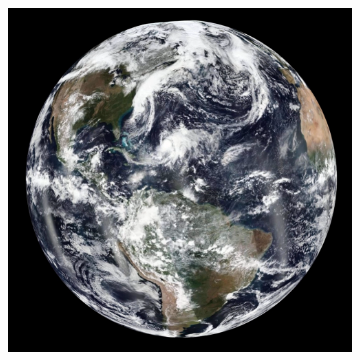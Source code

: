 \documentclass[journal]{vgtc}                %
\begin{document}
\begin{figure}
\begin{subfigure}[tb]{0.32\linewidth}
	\end{subfigure}
    \begin{subfigure}[tb]{0.32\linewidth}
    	\includegraphics[width=\textwidth]{earth_temporal/earth_temporal_viirs3.png}
	\end{subfigure}


\end{figure}
\end{document}
